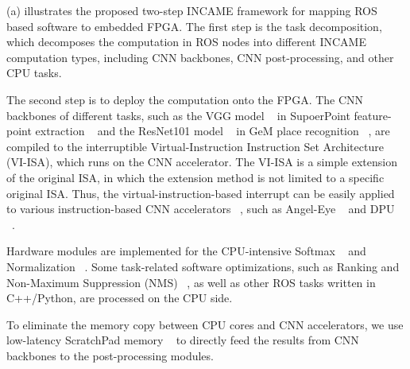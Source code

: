 
(a) illustrates the proposed two-step INCAME framework for mapping ROS based software to embedded FPGA.
The first step is the task decomposition, which decomposes the computation in ROS nodes into different INCAME computation types, including CNN backbones, CNN post-processing, and other CPU tasks. 

The second step is to deploy the computation onto the FPGA. 
The CNN backbones of different tasks, such as the VGG model  ~\cite{kim2016accurate} in SupoerPoint feature-point extraction  ~\cite{detone2018superpoint} and the ResNet101 model  ~\cite{he2016deep} in GeM place recognition  ~\cite{radenovic2018fine}, are compiled to the interruptible Virtual-Instruction Instruction Set Architecture (VI-ISA), which runs on the CNN accelerator. The VI-ISA is a simple extension of the original ISA, in which the extension method is not limited to a specific original ISA. Thus, the virtual-instruction-based interrupt can be easily applied to various instruction-based CNN accelerators  ~\cite{yu2018instruction,qiu2016going}, such as Angel-Eye ~\cite{guo2017angel} and DPU ~\cite{dpu}.

Hardware modules are implemented for the CPU-intensive Softmax  ~\cite{Softmax-wiki} and Normalization  ~\cite{Norm}. Some task-related software optimizations, such as Ranking and Non-Maximum Suppression (NMS)  ~\cite{NeubeckGool-NMS}, as well as other ROS tasks written in C++/Python, are processed on the CPU side.

To eliminate the memory copy between CPU cores and CNN accelerators, we use low-latency ScratchPad memory  ~\cite{Banakar2002Scratchpad} to directly feed the results from CNN backbones to the post-processing modules. 

